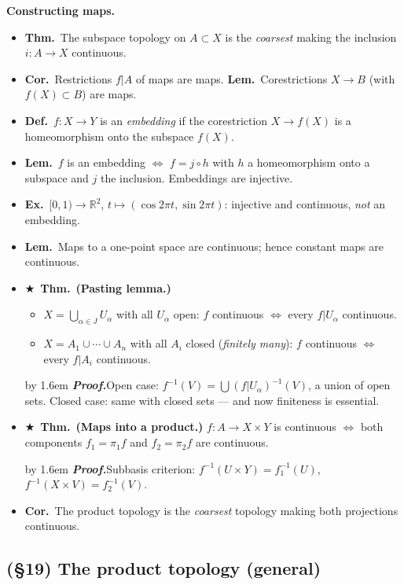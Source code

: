 \documentclass[12pt,a4paper]{article}
\newcommand{\Dfn}{\textbf{Def.}~}
\newcommand{\Thm}{\textbf{Thm.}~}
\newcommand{\Lem}{\textbf{Lem.}~}
\newcommand{\Cor}{\textbf{Cor.}~}
\newcommand{\Exa}{\textbf{Ex.}~}
\newcommand{\Key}{$\bigstar$~}                  %
\newcommand{\Pf}[1]{%
  \par\addvspace{7pt}\nopagebreak
  \begingroup
    \advance\leftskip by 1.6em
    \parindent=0pt \small\color{prf}%
    \textbf{\textit{Proof.}}\enspace #1\par
  \endgroup
  \addvspace{9pt}}
\newenvironment{BL}%
  {\begin{itemize}[leftmargin=1.4em,labelsep=0.55em,itemsep=11pt,topsep=11pt,parsep=0pt]}%
  {\end{itemize}}
\newenvironment{SB}%
  {\begin{itemize}[label=--,leftmargin=1.3em,labelsep=0.45em,itemsep=6pt,topsep=7pt,parsep=0pt]}%
  {\end{itemize}}
\newcommand{\RR}{\mathbb{R}}
\renewcommand{\iff}{\Leftrightarrow}
\begin{document}
\textbf{Constructing maps.}
\begin{BL}
\item \Thm The subspace topology on $A\subset X$ is the \emph{coarsest} making the inclusion
      $i\colon A\to X$ continuous.
\item \Cor Restrictions $f|A$ of maps are maps.\quad
      \Lem Corestrictions $X\to B$ (with $f(X)\subset B$) are maps.
\item \Dfn $f\colon X\to Y$ is an \emph{embedding} if the corestriction $X\to f(X)$ is a
      homeomorphism onto the subspace $f(X)$.
\item \Lem $f$ is an embedding $\iff$ $f=j\circ h$ with $h$ a homeomorphism onto a subspace
      and $j$ the inclusion. Embeddings are injective.
\item \Exa $[0,1)\to\RR^2$, $t\mapsto(\cos2\pi t,\sin2\pi t)$: injective and continuous,
      \emph{not} an embedding.
\item \Lem Maps to a one-point space are continuous; hence constant maps are continuous.
\item \Key\Thm \textbf{(Pasting lemma.)}
  \begin{SB}
  \item $X=\bigcup_{\alpha\in J}U_\alpha$ with all $U_\alpha$ open:
        $f$ continuous $\iff$ every $f|U_\alpha$ continuous.
  \item $X=A_1\cup\cdots\cup A_n$ with all $A_i$ closed (\emph{finitely many}):
        $f$ continuous $\iff$ every $f|A_i$ continuous.
  \end{SB}
\Pf{Open case: $f^{-1}(V)=\bigcup(f|U_\alpha)^{-1}(V)$, a union of open sets.
Closed case: same with closed sets --- and now finiteness is essential.}
\item \Key\Thm \textbf{(Maps into a product.)} $f\colon A\to X\times Y$ is continuous
      $\iff$ both components $f_1=\pi_1 f$ and $f_2=\pi_2 f$ are continuous.
\Pf{Subbasis criterion: $f^{-1}(U\times Y)=f_1^{-1}(U)$, $f^{-1}(X\times V)=f_2^{-1}(V)$.}
\item \Cor The product topology is the \emph{coarsest} topology making both projections
      continuous.
\end{BL}

\subsection{(\S19) The product topology (general)}
\end{document}

